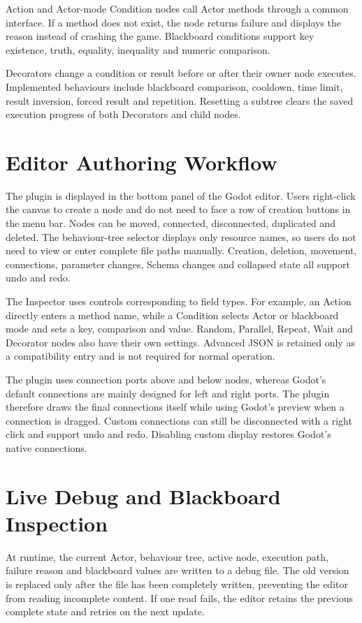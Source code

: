 Action and Actor-mode Condition nodes call Actor methods through a common interface. If a method does not exist, the node returns failure and displays the reason instead of crashing the game. Blackboard conditions support key existence, truth, equality, inequality and numeric comparison.

Decorators change a condition or result before or after their owner node executes. Implemented behaviours include blackboard comparison, cooldown, time limit, result inversion, forced result and repetition. Resetting a subtree clears the saved execution progress of both Decorators and child nodes.

\section{Editor Authoring Workflow}

The plugin is displayed in the bottom panel of the Godot editor. Users right-click the canvas to create a node and do not need to face a row of creation buttons in the menu bar. Nodes can be moved, connected, disconnected, duplicated and deleted. The behaviour-tree selector displays only resource names, so users do not need to view or enter complete file paths manually. Creation, deletion, movement, connections, parameter changes, Schema changes and collapsed state all support undo and redo.

The Inspector uses controls corresponding to field types. For example, an Action directly enters a method name, while a Condition selects Actor or blackboard mode and sets a key, comparison and value. Random, Parallel, Repeat, Wait and Decorator nodes also have their own settings. Advanced JSON is retained only as a compatibility entry and is not required for normal operation.

The plugin uses connection ports above and below nodes, whereas Godot's default connections are mainly designed for left and right ports. The plugin therefore draws the final connections itself while using Godot's preview when a connection is dragged. Custom connections can still be disconnected with a right click and support undo and redo. Disabling custom display restores Godot's native connections.

\section{Live Debug and Blackboard Inspection}

At runtime, the current Actor, behaviour tree, active node, execution path, failure reason and blackboard values are written to a debug file. The old version is replaced only after the file has been completely written, preventing the editor from reading incomplete content. If one read fails, the editor retains the previous complete state and retries on the next update.


